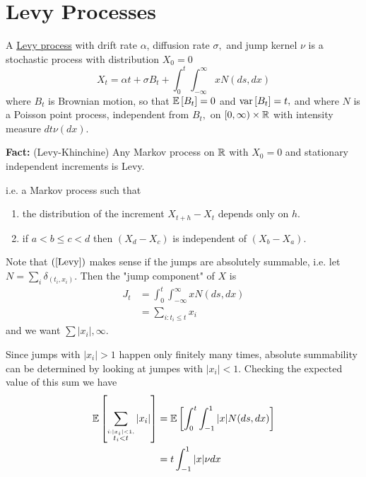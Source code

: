 \documentclass[../../../Master/AppliedStochastics.tex]{subfiles}
\author{Martin}
\date{14 November 2018}
\begin{document}
%


\makelecture


\section{Levy Processes}

\begin{definition}
	A \underline{Levy process} with 
	drift rate $\alpha$,
	diffusion rate $\sigma,$
	and jump kernel $\nu$
	is a stochastic process with distribution $X_0 = 0$
	\begin{equation}
	X_t
	=\alpha t 
	+ \sigma B_t 
	+ \int_{0}^{t} \int_{-\infty}^{\infty} x N(ds , dx) \label{Levy}
	\end{equation}
	where $B_t$ is Brownian motion,
	so that $\mathbb{E} \left[ B_t \right] = 0$
	and $\operatorname{var} \left[ B_t \right] = t,$
	and where $N$ is a Poisson point process, independent from $B_t,$ on
	$\left [ 0 , \infty \right) \times \mathbb{R}$
	with intensity measure $dt \nu(dx).$ 
\end{definition}

\textbf{Fact:} (Levy-Khinchine)
	Any Markov process on $\mathbb{R}$ with $X_0 = 0$ and stationary independent 
	increments is Levy.
	
	i.e. a Markov process such that
	\begin{enumerate}
		\item the distribution of the increment $X_{t + h} - X_t$ depends only 
		on $h.$ 
		\item if $a < b \leq c < d$ then $(X_d - X_c)$ is independent of $(X_b 
		- X_a).$
	\end{enumerate} 

Note that $(\ref{Levy})$ makes sense if the jumps are absolutely summable, 
i.e. let $N = \sum_{i} \delta_{(t_i ,x_i)}.$
Then the "jump component" of $X$ is 
$$
\begin{aligned}
J_t 
&= \int_{0}^{t} \int _{-\infty}^{\infty} x N(ds, dx) \\
&= \sum_{i : t_i \leq t} x_i
\end{aligned}
$$
and we want $\sum |x_i| , \infty.$

Since jumps with $|x_i| > 1$ happen only finitely many times, absolute 
summability can be determined by looking at jumpes with $|x_i| < 1.$
Checking the expected value of this sum we have
$$
\begin{aligned}
\mathbb{E} \left[ \sum_{\stackrel{i : |x_i| < 1,}{ t_i < t}} |x_i|  \right] 
& = \mathbb{E} \left[ \int_{0}^{t} \int_{-1}^{1} |x| N(ds, dx)          \right] \\ 
& = t \int _{-1}^{1} |x| \nu dx
\end{aligned}
$$
\end{document}
